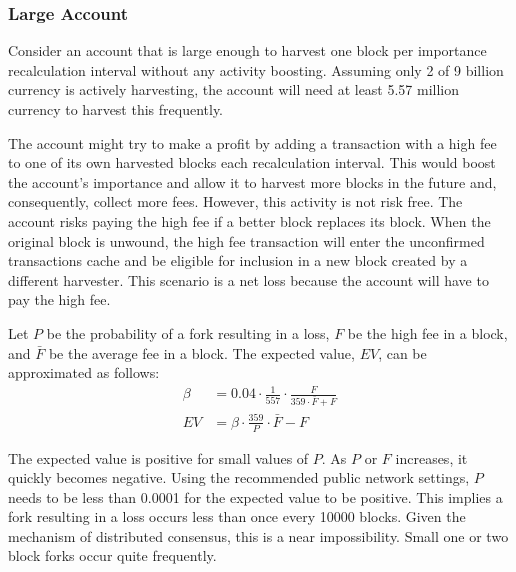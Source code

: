 \subsubsection*{Large Account}

Consider an account that is large enough to harvest one block per importance recalculation interval without any activity boosting.
Assuming only 2 of 9 billion currency is actively harvesting, the account will need at least 5.57 million currency to harvest this frequently.

The account might try to make a profit by adding a transaction with a high fee to one of its own harvested blocks each recalculation interval.
This would boost the account's importance and allow it to harvest more blocks in the future and, consequently, collect more fees.
However, this activity is not risk free.
The account risks paying the high fee if a better block replaces its block.
When the original block is unwound, the high fee transaction will enter the unconfirmed transactions cache and be eligible for inclusion in a new block created by a different harvester.
This scenario is a net loss because the account will have to pay the high fee.

Let $P$ be the probability of a fork resulting in a loss, $F$ be the high fee in a block, and $\bar{F}$ be the average fee in a block.
The expected value, $EV$, can be approximated as follows:
\begin{align*}
	\tag{importance boost}\beta &= 0.04 \cdot \frac{1}{557} \cdot \frac{F}{359 \cdot \bar{F} + F} \\
	\tag{expected value} EV &= \beta \cdot \frac{359}{P} \cdot \bar{F} - F
\end{align*}

The expected value is positive for small values of $P$.
As $P$ or $F$ increases, it quickly becomes negative.
Using the recommended public network settings, $P$ needs to be less than 0.0001 for the expected value to be positive.
This implies a fork resulting in a loss occurs less than once every 10000 blocks.
Given the mechanism of distributed consensus, this is a near impossibility.
Small one or two block forks occur quite frequently.

\begin{figure}[H]
\end{figure}

